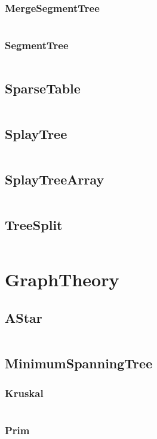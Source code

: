 \documentclass[a4paper,11pt]{article}
\begin{document}
\subsubsection{MergeSegmentTree}
\inputminted[breaklines]{c++}{03++DataStructure/+SegmentTree/+MergeSegmentTree.cpp}
\subsubsection{SegmentTree}
\inputminted[breaklines]{c++}{03++DataStructure/+SegmentTree/+SegmentTree.cpp}

\subsection{SparseTable}
\inputminted[breaklines]{c++}{03++DataStructure/+SparseTable.cpp}
\subsection{SplayTree}
\inputminted[breaklines]{c++}{03++DataStructure/+SplayTree.cpp}
\subsection{SplayTreeArray}
\inputminted[breaklines]{c++}{03++DataStructure/+SplayTreeArray.cpp}
\subsection{TreeSplit}
\inputminted[breaklines]{c++}{03++DataStructure/+TreeSplit.cpp}

\newpage
\section{GraphTheory}
\subsection{AStar}
\inputminted[breaklines]{c++}{04++GraphTheory/+AStar.cpp}
\subsection{MinimumSpanningTree}
\subsubsection{Kruskal}
\inputminted[breaklines]{c++}{04++GraphTheory/+MinimumSpanningTree/+Kruskal.cpp}
\subsubsection{Prim}
\inputminted[breaklines]{c++}{04++GraphTheory/+MinimumSpanningTree/+Prim.cpp}
\end{document}
